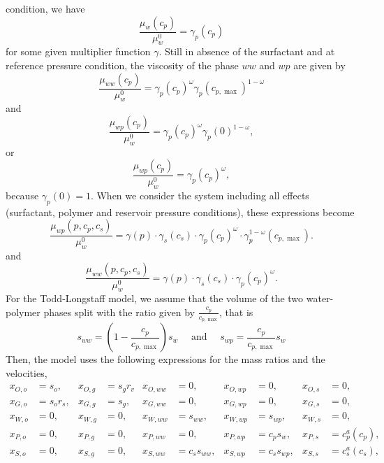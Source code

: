 \documentclass[11pt]{amsart}
\newcommand{\cpmax}{c_{p,\max}}
\begin{document}
condition, we have
\begin{equation*}
  \frac{\mu_w(c_p)}{\mu_w^0} = \gamma_p(c_p)
\end{equation*}
for some given multiplier function $\gamma$. Still in absence of the surfactant
and at reference pressure condition, the viscosity of the phase $ww$ and $wp$ are given by
\begin{equation*}
  \frac{\mu_{ww}(c_p)}{\mu_w^0} = \gamma_p(c_p)^\omega\gamma_p(\cpmax)^{1-\omega}
\end{equation*}
and
\begin{equation*}
  \frac{\mu_{wp}(c_p)}{\mu_w^0} = \gamma_p(c_p)^\omega\gamma_p(0)^{1-\omega},
\end{equation*}
or
\begin{equation*}
  \frac{\mu_{wp}(c_p)}{\mu_w^0} = \gamma_p(c_p)^\omega,
\end{equation*}
because $\gamma_p(0)=1$. When we consider the system including all effects
(surfactant, polymer and reservoir pressure conditions), these expressions
become
\begin{equation}
  \label{eq:defmuwp}
  \frac{\mu_{wp}(p, c_p, c_s)}{\mu_w^0} = \gamma(p)\cdot\gamma_s(c_s)\cdot\gamma_p(c_p)^\omega\cdot\gamma_p^{1-\omega}(\cpmax).
\end{equation}
and
\begin{equation}
  \label{eq:defmuww}
  \frac{\mu_{ww}(p, c_p, c_s)}{\mu_w^0} = \gamma(p)\cdot\gamma_s(c_s)\cdot\gamma_p(c_p)^\omega.
\end{equation}
For the Todd-Longstaff model, we assume that the volume of the two water-polymer
phases split with the ratio given by $\frac{c_p}{\cpmax}$, that is
\begin{equation*}
  s_{ww} = \left(1 - \frac{c_p}{\cpmax}\right)s_w \quad\text{ and }\quad s_{wp} = \frac{c_p}{\cpmax}s_w 
\end{equation*}
Then, the model uses the following expressions for the mass ratios and the velocities,
\begin{align*}
  x_{O,o} &= s_o,    & x_{O,g} &= s_g r_v & x_{O,ww} &= 0,      & x_{O,wp} &= 0,     & x_{O,s} &= 0,  \\
  x_{G,o} &= s_or_s, & x_{G,g} &= s_g,    & x_{G,ww} &= 0,      & x_{G,wp} &= 0,     & x_{G,s} &= 0,  \\
  x_{W,o} &= 0,      & x_{W,g} &= 0,      & x_{W,ww} &= s_{ww}, & x_{W,wp} &= s_{wp},& x_{W,s} &= 0, \\
  x_{P,o} &= 0,      & x_{P,g} &= 0,      & x_{P,ww} &= 0,      & x_{P,wp} &= c_ps_{w},& x_{P,s} &= c_p^a(c_p), \\
  x_{S,o} &= 0,      & x_{S,g} &= 0,      & x_{S,ww} &= c_ss_{ww}, & x_{S,wp} &= c_ss_{wp},& x_{S,s} &= c_s^a(c_s),
\end{align*}
\end{document}
